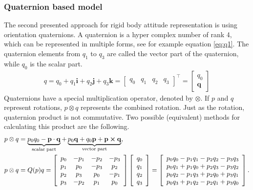 \subsubsection{Quaternion based model}
The second presented approach for rigid body attitude representation is using orientation quaternions. A quaternion is a hyper complex number of rank 4, which can be represented in multiple forms, see for example equation \eqref{eq:q1}. The quaternion elements from $q_1$ to $q_3$ are called the vector part of the quaternion, while $q_0$ is the scalar part.
\begin{align}
    q = q_0 + q_1\mathbf{i} + q_2\mathbf{j} + q_3\mathbf{k} = \begin{bmatrix}q_0 & q_1 &q_2& q_3 \end{bmatrix}^\top = \begin{bmatrix}q_0 \\ \mathbf{q} \end{bmatrix} \label{eq:q1}
\end{align}
Quaternions have a special multiplication operator, denoted by $\otimes$. If $p$ and $q$ represent rotations, $p\otimes q$ represents the combined rotation. Just as the rotation, quaternion product is not commutative. Two possible (equivalent) methods for calculating this product are the following.
\begin{align}
    p\otimes q &= \underbrace{p_0 q_0 - \mathbf{p}\cdot\mathbf{q}}_{\mathrm{scalar\; part}} +\underbrace{p_0 \mathbf{q} +q_0\mathbf{p} + \mathbf{p}\cross\mathbf{q}}_{\mathrm{vector\; part}},\\
    p\otimes q &= Q(p) q=\left[\begin{array}{cccc}
p_{0} & -p_{1} & -p_{2} & -p_{3} \\
p_{1} & p_{0} & -p_{3} & p_{2} \\
p_{2} & p_{3} & p_{0} & -p_{1} \\
p_{3} & -p_{2} & p_{1} & p_{0}
\end{array}\right]\left[\begin{array}{l}
q_{0} \\
q_{1} \\
q_{2} \\
q_{3}
\end{array}\right] = \left[\begin{array}{l}
p_{0} q_{0}-p_{1} q_{1}-p_{2} q_{2}-p_{3} q_{3} \\
p_{0} q_{1}+p_{1} q_{0}+p_{2} q_{3}-p_{3} q_{2} \\
p_{0} q_{2}-p_{1} q_{3}+p_{2} q_{0}+p_{3} q_{1} \\
p_{0} q_{3}+p_{1} q_{2}-p_{2} q_{1}+p_{3} q_{0}
\end{array}\right].
\end{align}

